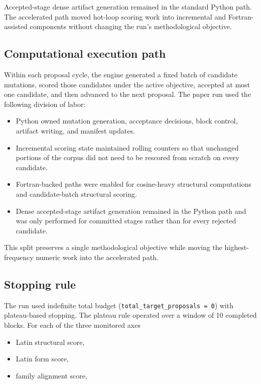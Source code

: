\documentclass[11pt]{article}
\begin{document}
Accepted-stage dense artifact generation remained in the standard Python path.
The accelerated path moved hot-loop scoring work into incremental and
Fortran-assisted components without changing the run's methodological objective.

\subsection{Computational execution path}

Within each proposal cycle, the engine generated a fixed batch of candidate
mutations, scored those candidates under the active objective, accepted at most
one candidate, and then advanced to the next proposal. The paper run used the
following division of labor:

\begin{itemize}
    \item Python owned mutation generation, acceptance decisions, block
    control, artifact writing, and manifest updates.
    \item Incremental scoring state maintained rolling counters so that
    unchanged portions of the corpus did not need to be rescored from scratch
    on every candidate.
    \item Fortran-backed paths were enabled for cosine-heavy structural
    computations and candidate-batch structural scoring.
    \item Dense accepted-stage artifact generation remained in the Python path
    and was only performed for committed stages rather than for every rejected
    candidate.
\end{itemize}

This split preserves a single methodological objective while moving the
highest-frequency numeric work into the accelerated path.

\subsection{Stopping rule}

The run used indefinite total budget (\texttt{total\_target\_proposals = 0})
with plateau-based stopping. The plateau rule operated over a window of 10
completed blocks. For each of the three monitored axes

\begin{itemize}
    \item Latin structural score,
    \item Latin form score,
    \item family alignment score,
\end{itemize}
\end{document}
